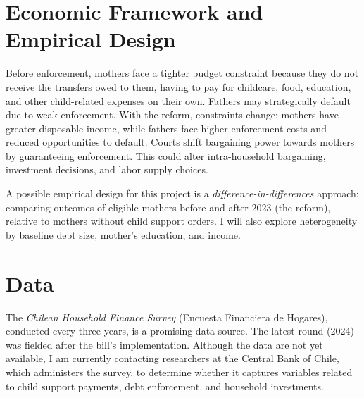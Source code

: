\section{ Economic Framework and Empirical Design}
Before enforcement, mothers face a tighter budget constraint because they do not receive the transfers owed to them, having to pay for childcare, food, education, and other child-related expenses on their own. Fathers may strategically default due to weak enforcement. With the reform, constraints change: mothers have greater disposable income, while fathers face higher enforcement costs and reduced opportunities to default. Courts shift bargaining power towards mothers by guaranteeing enforcement. This could alter intra-household bargaining, investment decisions, and labor supply choices.

A possible empirical design for this project is a \textit{difference-in-differences} approach: comparing outcomes of eligible mothers before and after 2023 (the reform), relative to mothers without child support orders. I will also explore heterogeneity by baseline debt size, mother’s education, and income.

\section{ Data}
The \textit{Chilean Household Finance Survey} (Encuesta Financiera de Hogares), conducted every three years, is a promising data source. The latest round (2024) was fielded after the bill’s implementation. Although the data are not yet available, I am currently contacting researchers at the Central Bank of Chile, which administers the survey, to determine whether it captures variables related to child support payments, debt enforcement, and household investments.





